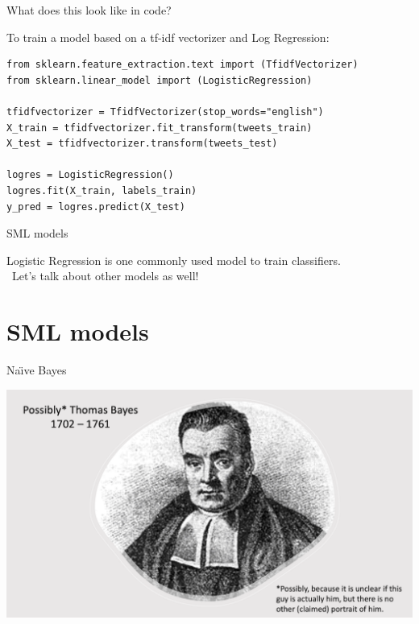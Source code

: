 \documentclass[compress]{beamer}
\begin{document}
\begin{frame}[fragile]{What does this look like in code?}
	
To train a model based on a tf-idf vectorizer and Log Regression:
	
\begin{lstlisting}
from sklearn.feature_extraction.text import (TfidfVectorizer)
from sklearn.linear_model import (LogisticRegression)
		
tfidfvectorizer = TfidfVectorizer(stop_words="english")
X_train = tfidfvectorizer.fit_transform(tweets_train)
X_test = tfidfvectorizer.transform(tweets_test)
		
logres = LogisticRegression()
logres.fit(X_train, labels_train)
y_pred = logres.predict(X_test)
\end{lstlisting}
	
\end{frame}


\begin{frame}[fragile]{SML models}
	
Logistic Regression is one commonly used model to train classifiers. \\\
Let's talk about other models as well!
	
\end{frame}


\section{SML models}

\begin{frame}{Na\"{\i}ve Bayes}
	
\begin{center}
\includegraphics[width=\linewidth,height=\textheight,keepaspectratio]{../pictures/ThomasBayes.png} \\\
\end{center}
\end{frame}
\end{document}
